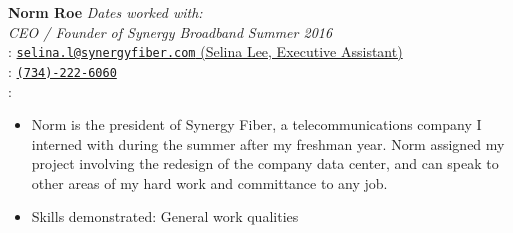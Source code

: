 \documentclass[margin,line,11pt]{resume}
\begin{document}
\begin{resume}
	\textbf{Norm Roe} \hfill \textsl{Dates worked with:}\\%
	\textsl{CEO / Founder of Synergy Broadband} \hfill \textsl{Summer 2016} \\
	\faEnvelope : \href{mailto:selina.l@synergyfiber.com}{\nolinkurl{selina.l@synergyfiber.com} (Selina Lee, Executive Assistant)} \\
	\faPhone : \href{tel:+1-734-222-6060}{\nolinkurl{(734)-222-6060}} \\
	 \faHome : \rmfamily \\ 
	 \vspace{-4mm}
	 \begin{itemize} 
	 	\item Norm is the president of Synergy Fiber, a telecommunications company I interned with during the summer after my freshman year. Norm assigned my project involving the redesign of the company data center, and can speak to other areas of my hard work and committance to any job.
		\item Skills demonstrated: General work qualities
	\end{itemize}
	
	\vspace{5mm}
	 \sectionbreak
		
\end{resume}
\end{document}
